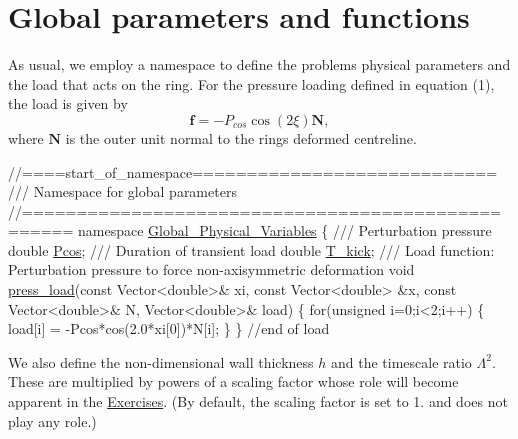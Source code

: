  

\hypertarget{index_namespace}{}\section{Global parameters and functions}\label{index_namespace}
As usual, we employ a namespace to define the problem\textquotesingle{}s physical parameters and the load that acts on the ring. For the pressure loading defined in equation (1), the load is given by \[ \mathbf{f} = -P_{cos}\cos\left(2\xi\right)\mathbf{N}, \] where $ \mathbf{N} $ is the outer unit normal to the ring\textquotesingle{}s deformed centreline.

 
\begin{DoxyCodeInclude}
\textcolor{comment}{//====start\_of\_namespace============================}
\textcolor{comment}{/// Namespace for global parameters}
\textcolor{comment}{}\textcolor{comment}{//==================================================}
\textcolor{keyword}{namespace }\hyperlink{namespaceGlobal__Physical__Variables}{Global\_Physical\_Variables}
\{
\textcolor{comment}{}
\textcolor{comment}{ /// Perturbation pressure}
\textcolor{comment}{} \textcolor{keywordtype}{double} \hyperlink{namespaceGlobal__Physical__Variables_ab55734aaa66260cd9d4bf68a4ecafdd5}{Pcos};
\textcolor{comment}{}
\textcolor{comment}{ /// Duration of transient load}
\textcolor{comment}{} \textcolor{keywordtype}{double} \hyperlink{namespaceGlobal__Physical__Variables_a8a2c0589daf61085e7ebec410cbbbc76}{T\_kick};
\textcolor{comment}{}
\textcolor{comment}{ /// Load function: Perturbation pressure to force non-axisymmetric deformation}
\textcolor{comment}{} \textcolor{keywordtype}{void} \hyperlink{namespaceGlobal__Physical__Variables_a86fd8f502cb8c4c7939ffae742f023eb}{press\_load}(\textcolor{keyword}{const} Vector<double>& xi,
                 \textcolor{keyword}{const} Vector<double> &x,
                 \textcolor{keyword}{const} Vector<double>& N,
                 Vector<double>& load)
 \{
  \textcolor{keywordflow}{for}(\textcolor{keywordtype}{unsigned} i=0;i<2;i++) 
   \{
    load[i] = -Pcos*cos(2.0*xi[0])*N[i];
   \}
 \} \textcolor{comment}{//end of load}

\end{DoxyCodeInclude}


We also define the non-\/dimensional wall thickness $ h $ and the timescale ratio $ \Lambda^2 $. These are multiplied by powers of a scaling factor whose role will become apparent in the \hyperlink{index_exercises}{Exercises}. (By default, the scaling factor is set to 1. and does not play any role.)



